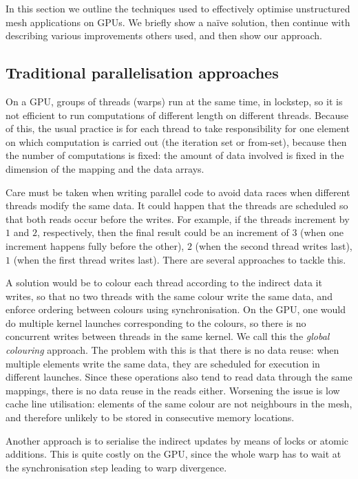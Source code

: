 In this section we outline the techniques used to effectively optimise
unstructured mesh applications on GPUs. We briefly show a naïve solution, then
continue with describing various improvements others used, and then show our
approach.

\subsection{Traditional parallelisation approaches}

On a GPU, groups of threads (warps) run at the same time, in lockstep, so it is
not efficient to run computations of different length on different threads.
Because of this, the usual practice is for each thread to take responsibility
for one element on which computation is carried out (the iteration set or
from-set), because then the number of computations is fixed: the amount of data
involved is fixed in the dimension of the mapping and the data arrays.

Care must be taken when writing parallel code to avoid data races when different
threads modify the same data. It could happen that the threads are scheduled so
that both reads occur before the writes. For example, if the threads increment
by $1$ and $2$, respectively, then the final result could be an increment of $3$
(when one increment happens fully before the other), $2$ (when the second thread
writes last), $1$ (when the first thread writes last). There are several
approaches to tackle this.

A solution would be to colour each thread according to the indirect data it
writes, so that no two threads with the same colour write the same data, and
enforce ordering between colours using synchronisation. On the GPU, one would do
multiple kernel launches corresponding to the colours, so there is no concurrent
writes between threads in the same kernel. We call this the \emph{global
colouring} approach. The problem with this is that there is no data reuse: when
multiple elements write the same data, they are scheduled for execution in
different launches. Since these operations also tend to read data through the
same mappings, there is no data reuse in the reads either. Worsening the issue
is low cache line utilisation: elements of the same colour are not neighbours in
the mesh, and therefore unlikely to be stored in consecutive memory locations.

Another approach is to serialise the indirect updates by means of locks or
atomic additions. This is quite costly on the GPU, since the whole warp has to
wait at the synchronisation step leading to warp divergence.

